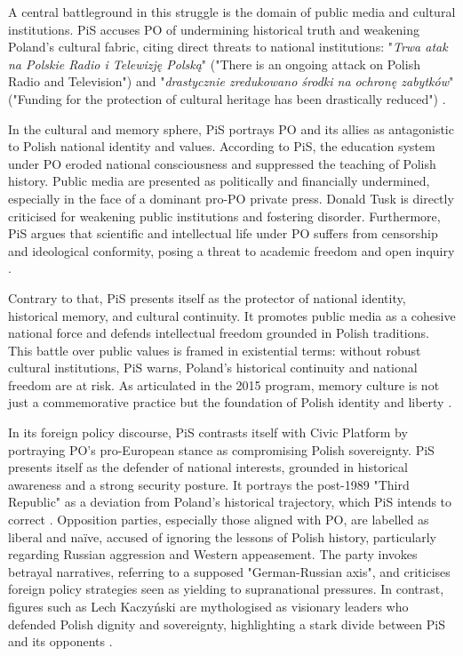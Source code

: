A central battleground in this struggle is the domain of public media and cultural institutions. PiS accuses PO of undermining historical truth and weakening Poland's cultural fabric, citing direct threats to national institutions: "\textit{Trwa atak na Polskie Radio i Telewizję Polską}" ("There is an ongoing attack on Polish Radio and Television") and "\textit{drastycznie zredukowano środki na ochronę zabytków}" ("Funding for the protection of cultural heritage has been drastically reduced") \citep{pis_program_2014}.

In the cultural and memory sphere, PiS portrays PO and its allies as antagonistic to Polish national identity and values. According to PiS, the education system under PO eroded national consciousness and suppressed the teaching of Polish history. Public media are presented as politically and financially undermined, especially in the face of a dominant pro-PO private press. Donald Tusk is directly criticised for weakening public institutions and fostering disorder. Furthermore, PiS argues that scientific and intellectual life under PO suffers from censorship and ideological conformity, posing a threat to academic freedom and open inquiry \citep{pis_program_2014}.

Contrary to that, PiS presents itself as the protector of national identity, historical memory, and cultural continuity. It promotes public media as a cohesive national force and defends intellectual freedom grounded in Polish traditions. This battle over public values is framed in existential terms: without robust cultural institutions, PiS warns, Poland's historical continuity and national freedom are at risk. As articulated in the 2015 program, memory culture is not just a commemorative practice but the foundation of Polish identity and liberty \citep{pis_program_2014}.

In its foreign policy discourse, PiS contrasts itself with Civic Platform by portraying PO's pro-European stance as compromising Polish sovereignty. PiS presents itself as the defender of national interests, grounded in historical awareness and a strong security posture. It portrays the post-1989 "Third Republic" as a deviation from Poland's historical trajectory, which PiS intends to correct \citep{pis_program_2023}. Opposition parties, especially those aligned with PO, are labelled as liberal and naïve, accused of ignoring the lessons of Polish history, particularly regarding Russian aggression and Western appeasement. The party invokes betrayal narratives, referring to a supposed "German-Russian axis", and criticises foreign policy strategies seen as yielding to supranational pressures. In contrast, figures such as Lech Kaczyński are mythologised as visionary leaders who defended Polish dignity and sovereignty, highlighting a stark divide between PiS and its opponents \citep{pis_program_2023}.

